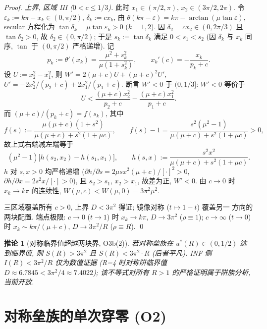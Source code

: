 \documentclass[UTF8]{ctexart}
\newtheorem{corollary}[theorem]{推论}
\begin{document}
\begin{proof}
\emph{上界, 区域 III ($0<c\le1/3$).} 此时 $x_1\in(\pi/2,\pi)$, $x_2\in(3\pi/2,2\pi)$.
令 $\varepsilon_k:=k\pi-x_k\in(0,\pi/2)$, $\delta_k:=cx_k$, 由
$\theta(k\pi-\varepsilon)=k\pi-\arctan(\mu\tan\varepsilon)$, secular 方程化为
$\tan\delta_k=\mu\tan\varepsilon_k>0$ ($k=1,2$). 因 $\delta_2=cx_2\in(0,2\pi/3)$
且 $\tan\delta_2>0$, 故 $\delta_2\in(0,\pi/2)$; 于是 $s_k:=\tan\delta_k$ 满足
$0<s_1<s_2$ (因 $\delta_k$ 与 $x_k$ 同序, $\tan$ 于 $(0,\pi/2)$ 严格递增). 记
\begin{equation}
	p_k:=\theta'(x_k)=\frac{\mu^2+s_k^2}{\mu(1+s_k^2)},\qquad
	x_k'(c)=-\frac{x_k}{p_k+c}.
\end{equation}
设 $U:=x_2^2-x_1^2$, 则 $W'=2(\mu+c)U+(\mu+c)^2U'$,
$U'=-2x_2^2/(p_2+c)+2x_1^2/(p_1+c)$. 断言 $W'<0$ 于 $(0,1/3]$: $W'<0$ 等价于
\begin{equation}
	U<\frac{(\mu+c)x_2^2}{p_2+c}-\frac{(\mu+c)x_1^2}{p_1+c}.
\end{equation}
而 $(\mu+c)/(p_k+c)=f(s_k)$, 其中
\begin{equation}
	f(s):=\frac{\mu(\mu+c)(1+s^2)}{\mu(\mu+c)+s^2(1+\mu c)},
	\qquad
	f(s)-1=\frac{s^2(\mu^2-1)}{\mu(\mu+c)+s^2(1+\mu c)}>0,
\end{equation}
故上式右端减左端等于
\begin{equation}
	(\mu^2-1)\bigl[h(s_2,x_2)-h(s_1,x_1)\bigr],
	\qquad
	h(s,x):=\frac{s^2x^2}{\mu(\mu+c)+s^2(1+\mu c)}.
\end{equation}
$h$ 对 $s,x>0$ 均严格递增 ($\partial h/\partial s=2\mu s x^2(\mu+c)/[\cdot]^2>0$,
$\partial h/\partial x=2s^2x/[\cdot]>0$), 且 $s_2>s_1$, $x_2>x_1$, 故差为正,
$W'<0$. 由 $c\to0$ 时 $x_k\to k\pi$ 的连续性, $W(\mu,c)<W(\mu,0)=3\pi^2\mu^2$.

三区域覆盖所有 $c>0$, 上界 $D<3\pi^2$ 得证; 镜像对称 ($t\mapsto1-t$) 覆盖另一
方向的两块配置. 端点极限: $c\to0$ ($t\to1$) 时 $x_k\to k\pi$, $D\to3\pi^2$
($\rho\equiv1$); $c\to\infty$ ($t\to0$) 时 $x_k\sim k\pi/(\mu+c)$, $D\to3\pi^2/R$
($\rho\equiv R$). \qed
\end{proof}

\begin{corollary}[对称临界值超越两块界, O3b(2)]
若对称垒族在 $u^*(R)\in(0,1/2)$ 达到临界值, 则
$S(R)>3\pi^2$ 且 $S(R)<3\pi^2\cdot R$ (后者平凡). INF 侧
$I(R)<3\pi^2/R$ 仅为数值证据 (R=4 时对称阱临界值 $D\approx6.7845<3\pi^2/4\approx7.4022$);
该不等式对所有 $R>1$ 的严格证明属于阱族分析, 当前开放.
\end{corollary}

\section{对称垒族的单次穿零 (O2)}
\end{document}
